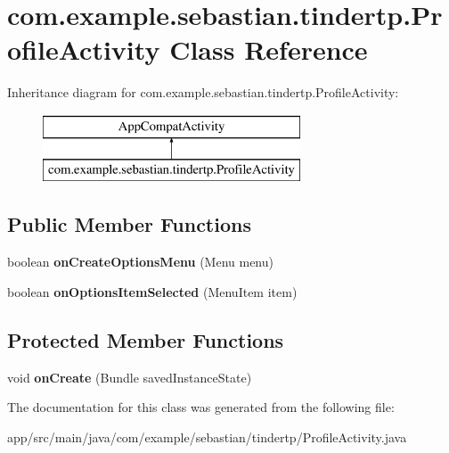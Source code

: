 \hypertarget{classcom_1_1example_1_1sebastian_1_1tindertp_1_1ProfileActivity}{}\section{com.\+example.\+sebastian.\+tindertp.\+Profile\+Activity Class Reference}
\label{classcom_1_1example_1_1sebastian_1_1tindertp_1_1ProfileActivity}
Inheritance diagram for com.\+example.\+sebastian.\+tindertp.\+Profile\+Activity\+:\begin{figure}[H]
\begin{center}
\leavevmode
\includegraphics[height=2.000000cm]{classcom_1_1example_1_1sebastian_1_1tindertp_1_1ProfileActivity}
\end{center}
\end{figure}
\subsection*{Public Member Functions}
\begin{DoxyCompactItemize}
\item 
boolean {\bfseries on\+Create\+Options\+Menu} (Menu menu)\hypertarget{classcom_1_1example_1_1sebastian_1_1tindertp_1_1ProfileActivity_ad4a8f1c68195e0532b58ae2377c9e5f1}{}\label{classcom_1_1example_1_1sebastian_1_1tindertp_1_1ProfileActivity_ad4a8f1c68195e0532b58ae2377c9e5f1}

\item 
boolean {\bfseries on\+Options\+Item\+Selected} (Menu\+Item item)\hypertarget{classcom_1_1example_1_1sebastian_1_1tindertp_1_1ProfileActivity_a0c3b858d900aff7b2e1ce0ccd3c30cc9}{}\label{classcom_1_1example_1_1sebastian_1_1tindertp_1_1ProfileActivity_a0c3b858d900aff7b2e1ce0ccd3c30cc9}

\end{DoxyCompactItemize}
\subsection*{Protected Member Functions}
\begin{DoxyCompactItemize}
\item 
void {\bfseries on\+Create} (Bundle saved\+Instance\+State)\hypertarget{classcom_1_1example_1_1sebastian_1_1tindertp_1_1ProfileActivity_a2aacc09a50bf2c48c83c5d2b94ec5810}{}\label{classcom_1_1example_1_1sebastian_1_1tindertp_1_1ProfileActivity_a2aacc09a50bf2c48c83c5d2b94ec5810}

\end{DoxyCompactItemize}


The documentation for this class was generated from the following file\+:\begin{DoxyCompactItemize}
\item 
app/src/main/java/com/example/sebastian/tindertp/Profile\+Activity.\+java\end{DoxyCompactItemize}
